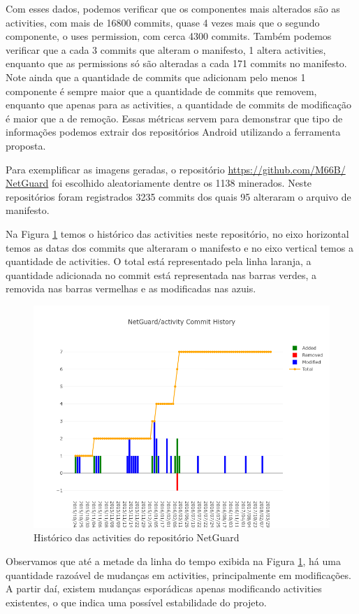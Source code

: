 \documentclass[a4paper,12pt]{article}
\begin{document}
{Com esses dados, podemos verificar que os componentes mais alterados são as activities, com mais de 16800 commits, quase 4 vezes mais que o segundo componente, o uses permission, com cerca 4300 commits. Também podemos verificar que a cada 3 commits que alteram o manifesto, 1 altera activities, enquanto que as permissions só são alteradas a cada 171 commits no manifesto. Note ainda que a quantidade de commits que adicionam pelo menos 1 componente é sempre maior que a quantidade de commits que removem, enquanto que apenas para as activities, a quantidade de commits de modificação é maior que a de remoção. Essas métricas servem para demonstrar que tipo de informações podemos extrair dos repositórios Android utilizando a ferramenta proposta. 

\sloppy
Para exemplificar as imagens geradas, o repositório {\fontsize{10pt}{12pt}\url{https://github.com/M66B/ NetGuard}} foi escolhido aleatoriamente dentre os 1138 minerados. Neste repositórios foram registrados 3235 commits dos quais 95 alteraram o arquivo de manifesto.

Na Figura \ref{fig:repoactivity} temos o histórico das activities neste repositório, no eixo horizontal temos as datas dos commits que alteraram o manifesto e no eixo vertical temos a quantidade de activities. O total está representado pela linha laranja, a quantidade adicionada no commit está representada nas barras verdes, a removida nas barras vermelhas e as modificadas nas azuis. 

\begin{figure}[H]
\centering
\includegraphics[width=\linewidth,height=0.5\linewidth]{imgs/NetGuard_activity_history.png}
\caption{Histórico das activities do repositório NetGuard}
\label{fig:repoactivity}
\end{figure}

Observamos que até a metade da linha do tempo exibida na Figura \ref{fig:repoactivity}, há uma quantidade razoável de mudanças em activities, principalmente em modificações. A partir daí, existem mudanças esporádicas apenas modificando activities existentes, o que indica uma possível estabilidade do projeto.

}
\end{document}
